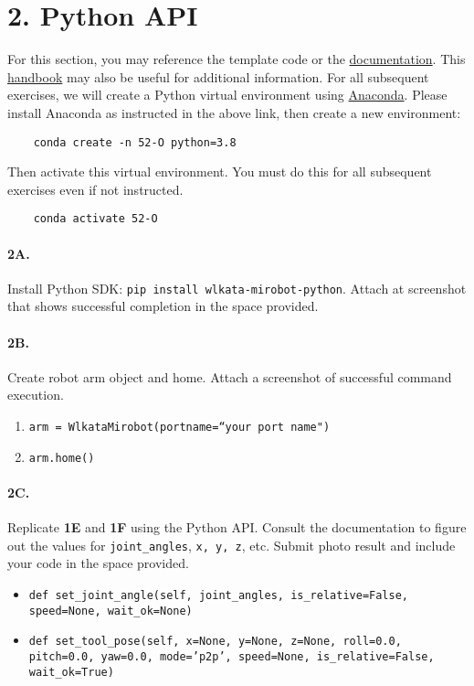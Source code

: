 \newpage
\section*{2. Python API}

For this section, you may reference the template code or the \href{https://document.wlkata.com/?doc=/wlkata-mirobot-resources-for-education/python-sdk/}{documentation}. This \href{https://docs.google.com/document/d/1Jh17WoaQvjzbp1AMjOTzPfXSAxNnE87V8AEH1H-iLk8/edit?usp=sharing}{handbook} may also be useful for additional information.
For all subsequent exercises, we will create a Python virtual environment using \href{https://www.anaconda.com/products/individual}{Anaconda}.
Please install Anaconda as instructed in the above link, then create a new environment:
%
\begin{verbatim}
    conda create -n 52-O python=3.8
\end{verbatim}

Then activate this virtual environment. You must do this for all subsequent exercises even if not instructed.
\begin{verbatim}
    conda activate 52-O
\end{verbatim}

\paragraph{2A.} Install Python SDK: \texttt{pip install wlkata-mirobot-python}. Attach at screenshot that shows successful completion in the space provided.

\paragraph{2B.} Create robot arm object and home.
Attach a screenshot of successful command execution.
\begin{enumerate} %
    \item \texttt{arm = WlkataMirobot(portname=``your port name")}
    \item \texttt{arm.home()}
\end{enumerate}

\paragraph{2C.} Replicate \textbf{1E} and \textbf{1F} using the Python API.
Consult the documentation to figure out the values for \texttt{joint\_angles}, \texttt{x, y, z}, etc.
Submit photo result and include your code in the space provided.
\begin{itemize}
    \item \texttt{def set\_joint\_angle(self, joint\_angles, is\_relative=False, speed=None, wait\_ok=None)}
    \item \texttt{def set\_tool\_pose(self, x=None, y=None, z=None, roll=0.0, pitch=0.0, yaw=0.0,  mode='p2p', speed=None, is\_relative=False, wait\_ok=True)}
\end{itemize}



